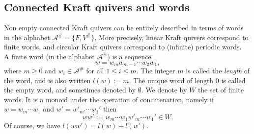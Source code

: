 \documentclass[12pt]{amsart}
\theoremstyle{definition}
\newtheorem{definition}[theorem]{Definition}
\newcommand{\<}{\langle}   %
\renewcommand{\>}{\rangle} %
\begin{document}
%

\subsection{Connected Kraft quivers and words}\label{SubsectionWords}

Non empty connected Kraft quivers can be entirely described in terms of words in the alphabet $\mathcal A^{\#} = \{F,V^{\#}\}$. More precisely, linear Kraft quivers correspond to finite words, and circular Kraft quivers correspond to (infinite) periodic words.\\
A finite word (in the alphabet $\mathcal A^{\#}$) is a sequence 
\begin{equation*}
    w = w_mw_{m-1}\cdots w_2w_1,
\end{equation*}
where $m \geq 0$ and $w_i \in \mathcal A^{\#}$ for all $1 \leq i \leq m$. The integer $m$ is called the \textit{length} of the word, and is also written $l(w) := m$. The unique word of length $0$ is called the empty word, and sometimes denoted by $\emptyset$. We denote by $W$ the set of finite words. It is a monoid under the operation of concatenation, namely if $w = w_m\cdots w_1$ and $w' = w'_{m'}\cdots w_1'$ then 
\begin{equation*}
    ww' := w_m\cdots w_1w'_{m'}\cdots w_1' \in W.
\end{equation*}
Of course, we have $l(ww') = l(w) + l(w')$.
\end{document}
